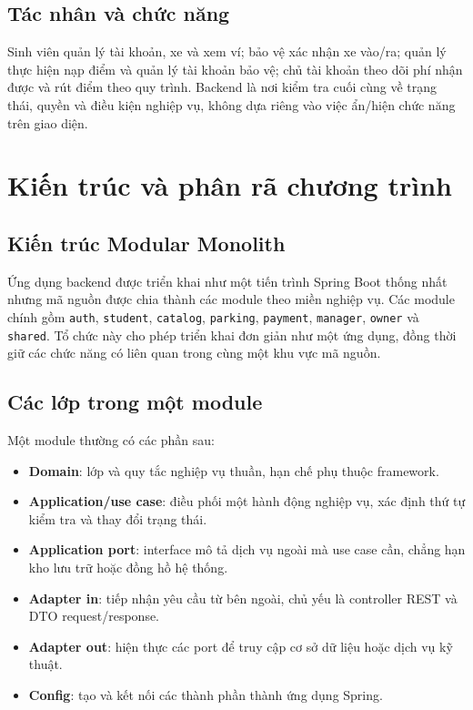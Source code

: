 \subsection{Tác nhân và chức năng}
Sinh viên quản lý tài khoản, xe và xem ví; bảo vệ xác nhận xe vào/ra; quản lý thực hiện nạp điểm và quản lý tài khoản bảo vệ; chủ tài khoản theo dõi phí nhận được và rút điểm theo quy trình. Backend là nơi kiểm tra cuối cùng về trạng thái, quyền và điều kiện nghiệp vụ, không dựa riêng vào việc ẩn/hiện chức năng trên giao diện.

\section{Kiến trúc và phân rã chương trình}

\subsection{Kiến trúc Modular Monolith}
Ứng dụng backend được triển khai như một tiến trình Spring Boot thống nhất nhưng mã nguồn được chia thành các module theo miền nghiệp vụ. Các module chính gồm \texttt{auth}, \texttt{student}, \texttt{catalog}, \texttt{parking}, \texttt{payment}, \texttt{manager}, \texttt{owner} và \texttt{shared}. Tổ chức này cho phép triển khai đơn giản như một ứng dụng, đồng thời giữ các chức năng có liên quan trong cùng một khu vực mã nguồn.

\subsection{Các lớp trong một module}
Một module thường có các phần sau:
\begin{itemize}
    \item \textbf{Domain}: lớp và quy tắc nghiệp vụ thuần, hạn chế phụ thuộc framework.
    \item \textbf{Application/use case}: điều phối một hành động nghiệp vụ, xác định thứ tự kiểm tra và thay đổi trạng thái.
    \item \textbf{Application port}: interface mô tả dịch vụ ngoài mà use case cần, chẳng hạn kho lưu trữ hoặc đồng hồ hệ thống.
    \item \textbf{Adapter in}: tiếp nhận yêu cầu từ bên ngoài, chủ yếu là controller REST và DTO request/response.
    \item \textbf{Adapter out}: hiện thực các port để truy cập cơ sở dữ liệu hoặc dịch vụ kỹ thuật.
    \item \textbf{Config}: tạo và kết nối các thành phần thành ứng dụng Spring.
\end{itemize}

